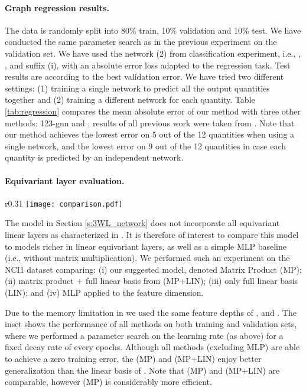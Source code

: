\documentclass{article}
\newcommand{\ie}{{i.e.}}
\begin{document}
\paragraph{Graph regression results.}  
The data is randomly split into 80\% train, 10\% validation and 10\% test. We have conducted the same parameter search as in the previous experiment on the validation set.  We have used the network (2) from classification experiment, \ie, , , and suffix (i), with an absolute error loss adapted to the regression task. Test results are according to the best validation error. We have tried two different settings: (1) training a single network to predict all the output quantities together and (2) training a different network for each quantity. Table \ref{tab:regression} compares the mean absolute error of our method with three other methods: 123-gnn \citep{morris2018weisfeiler} and \citep{wu2018moleculenet}; results of all previous work were taken from \citep{morris2018weisfeiler}. Note that our method achieves the lowest error on 5 out of the 12 quantities when using a single network, and the lowest error on 9 out of the 12 quantities in case each quantity is predicted by an independent network. 

\paragraph{Equivariant layer evaluation.} 

\begin{wrapfigure}[19]{r}{0.31\textwidth}\vspace{-15pt}
\texttt{[image: comparison.pdf]}
\end{wrapfigure}
The model in Section \ref{s:3WL_network} does not incorporate all equivariant linear layers as characterized in \citep{maron2018invariant}. It is therefore of interest to compare this model to models richer in linear equivariant layers, as well as a simple MLP baseline (\ie, without matrix multiplication). We performed such an experiment on the NCI1 dataset \citep{Yanardag2015} comparing: (i) our suggested model, denoted Matrix Product (MP); (ii) matrix product + full linear basis from \citep{maron2018invariant} (MP+LIN); (iii) only full linear basis (LIN); and (iv) MLP applied to the feature dimension. 

Due to the memory limitation in \citep{maron2018invariant} we used the same feature depths of , and . The inset shows the performance of all methods on both training and validation sets, where we performed a parameter search on the learning rate (as above) for a fixed decay rate of  every  epochs. Although all methods (excluding MLP) are able to achieve a zero training error, the (MP) and (MP+LIN) enjoy better generalization than the linear basis of \cite{maron2018invariant}. Note that (MP) and (MP+LIN) are comparable, however (MP) is considerably more efficient. 
\end{document}
